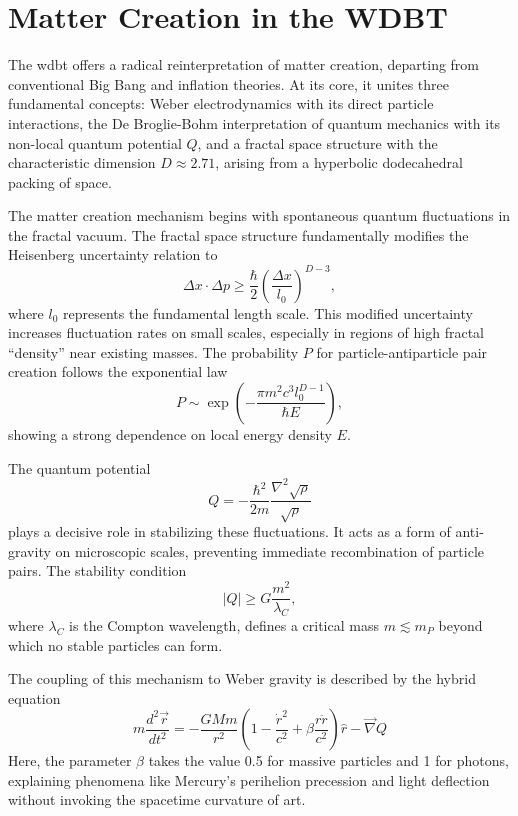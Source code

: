 \section{Matter Creation in the WDBT}
The \gls{wdbt} offers a radical reinterpretation of matter creation, departing from conventional Big Bang and inflation theories. At its core, it unites three fundamental concepts: Weber electrodynamics with its direct particle interactions, the De Broglie-Bohm interpretation of quantum mechanics with its non-local quantum potential $Q$, and a fractal space structure with the characteristic dimension $D \approx 2.71$, arising from a hyperbolic dodecahedral packing of space.

The matter creation mechanism begins with spontaneous quantum fluctuations in the fractal vacuum. The fractal space structure fundamentally modifies the Heisenberg uncertainty relation to
\begin{equation}
    \Delta x \cdot \Delta p \geq \frac{\hbar}{2} \left( \frac{\Delta x}{l_0} \right)^{D-3},
\end{equation}
where $l_0$ represents the fundamental length scale. This modified uncertainty increases fluctuation rates on small scales, especially in regions of high fractal \enquote{density} near existing masses. The probability $P$ for particle-antiparticle pair creation follows the exponential law
\begin{equation}
    P \sim \exp \left( -\frac{\pi m^2 c^3 l_0^{D-1}}{\hbar E} \right),
\end{equation}
showing a strong dependence on local energy density $E$.

The quantum potential
\begin{equation}
    Q = -\frac{\hbar^2}{2m} \frac{\nabla^2 \sqrt{\rho}}{\sqrt{\rho}}
\end{equation}
plays a decisive role in stabilizing these fluctuations. It acts as a form of anti-gravity on microscopic scales, preventing immediate recombination of particle pairs. The stability condition
\begin{equation}
    \left| Q \right| \ge G \frac{m^{2}}{\lambda_C},
\end{equation}
where $\lambda_C$ is the Compton wavelength, defines a critical mass $m \lesssim m_P$ beyond which no stable particles can form.

The coupling of this mechanism to Weber gravity is described by the hybrid equation
\begin{equation}
    m \frac{d^2 \vec{r}}{dt^2} = -\frac{GMm}{r^2} \left( 1 - \frac{\dot{r}^2}{c^2} + \beta \frac{r \ddot{r}}{c^2} \right) \hat{r} - \vec{\nabla} Q
\end{equation}
Here, the parameter $\beta$ takes the value 0.5 for massive particles and 1 for photons, explaining phenomena like Mercury's perihelion precession and light deflection without invoking the spacetime curvature of \gls{art}.

